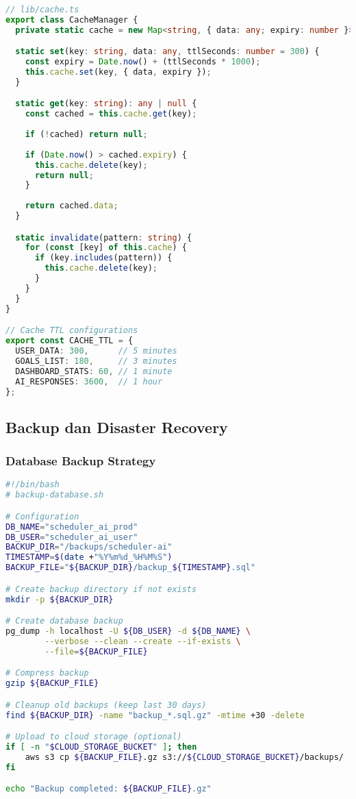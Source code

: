 \begin{lstlisting}[language=TypeScript, caption=Caching Configuration]
// lib/cache.ts
export class CacheManager {
  private static cache = new Map<string, { data: any; expiry: number }>();

  static set(key: string, data: any, ttlSeconds: number = 300) {
    const expiry = Date.now() + (ttlSeconds * 1000);
    this.cache.set(key, { data, expiry });
  }

  static get(key: string): any | null {
    const cached = this.cache.get(key);
    
    if (!cached) return null;
    
    if (Date.now() > cached.expiry) {
      this.cache.delete(key);
      return null;
    }
    
    return cached.data;
  }

  static invalidate(pattern: string) {
    for (const [key] of this.cache) {
      if (key.includes(pattern)) {
        this.cache.delete(key);
      }
    }
  }
}

// Cache TTL configurations
export const CACHE_TTL = {
  USER_DATA: 300,      // 5 minutes
  GOALS_LIST: 180,     // 3 minutes
  DASHBOARD_STATS: 60, // 1 minute
  AI_RESPONSES: 3600,  // 1 hour
};
\end{lstlisting}

\subsection{Backup dan Disaster Recovery}

\subsubsection{Database Backup Strategy}

\begin{lstlisting}[language=bash, caption=Database Backup Script]
#!/bin/bash
# backup-database.sh

# Configuration
DB_NAME="scheduler_ai_prod"
DB_USER="scheduler_ai_user"
BACKUP_DIR="/backups/scheduler-ai"
TIMESTAMP=$(date +"%Y%m%d_%H%M%S")
BACKUP_FILE="${BACKUP_DIR}/backup_${TIMESTAMP}.sql"

# Create backup directory if not exists
mkdir -p ${BACKUP_DIR}

# Create database backup
pg_dump -h localhost -U ${DB_USER} -d ${DB_NAME} \
        --verbose --clean --create --if-exists \
        --file=${BACKUP_FILE}

# Compress backup
gzip ${BACKUP_FILE}

# Cleanup old backups (keep last 30 days)
find ${BACKUP_DIR} -name "backup_*.sql.gz" -mtime +30 -delete

# Upload to cloud storage (optional)
if [ -n "$CLOUD_STORAGE_BUCKET" ]; then
    aws s3 cp ${BACKUP_FILE}.gz s3://${CLOUD_STORAGE_BUCKET}/backups/
fi

echo "Backup completed: ${BACKUP_FILE}.gz"
\end{lstlisting}


